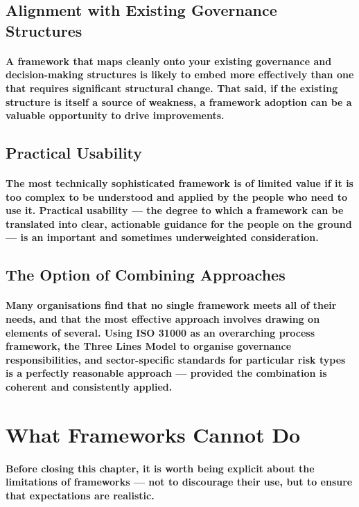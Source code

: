 \subsection{Alignment with Existing Governance Structures}
\paragraph{A framework that maps cleanly onto your existing governance and decision-making structures is likely to embed more effectively than one that requires significant structural change. That said, if the existing structure is itself a source of weakness, a framework adoption can be a valuable opportunity to drive improvements.}
\subsection{Practical Usability}
\paragraph{The most technically sophisticated framework is of limited value if it is too complex to be understood and applied by the people who need to use it. Practical usability — the degree to which a framework can be translated into clear, actionable guidance for the people on the ground — is an important and sometimes underweighted consideration.}
\subsection{The Option of Combining Approaches}
\paragraph{Many organisations find that no single framework meets all of their needs, and that the most effective approach involves drawing on elements of several. Using ISO 31000 as an overarching process framework, the Three Lines Model to organise governance responsibilities, and sector-specific standards for particular risk types is a perfectly reasonable approach — provided the combination is coherent and consistently applied.}


\section{What Frameworks Cannot Do}
\paragraph{Before closing this chapter, it is worth being explicit about the limitations of frameworks — not to discourage their use, but to ensure that expectations are realistic.}
